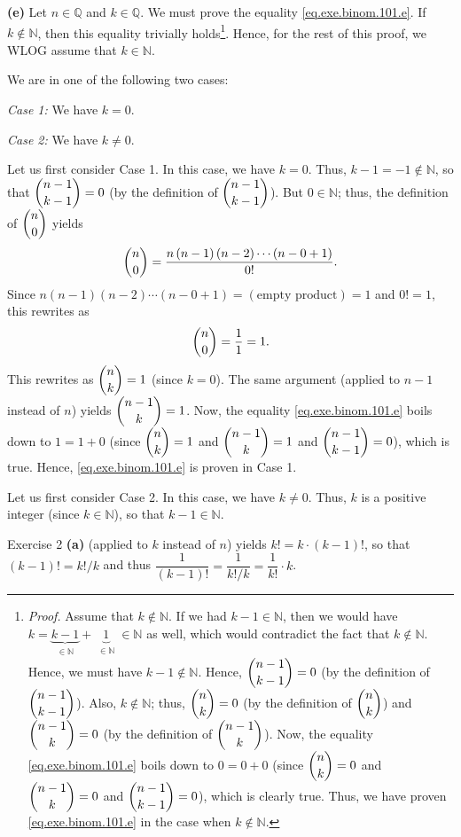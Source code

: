 \documentclass[paper=a4, fontsize=12pt]{scrartcl} %
\newcommand{\QQ}{\mathbb{Q}} %
\newcommand{\NN}{\mathbb{N}} %
\newcommand{\tup}[1]{\left( #1 \right)}
\newcommand{\underbrack}[2]{\underbrace{#1}_{\substack{#2}}}
\theoremstyle{plainsl}
\theoremstyle{definition}
\theoremstyle{remark}
\begin{document}
\textbf{(e)}
Let $n \in \QQ$ and $k \in \QQ$.
We must prove the equality \eqref{eq.exe.binom.101.e}.
If $k \notin \NN$, then this equality trivially
holds\footnote{\textit{Proof.} Assume that $k \notin \NN$.
If we had $k-1 \in \NN$, then we would have
$k = \underbrack{k-1}{\in \NN} + \underbrack{1}{\in \NN} \in \NN$
as well, which would contradict the fact that $k \notin \NN$.
Hence, we must have $k-1 \notin \NN$.
Hence, $\dbinom{n-1}{k-1} = 0$ (by the definition of
$\dbinom{n-1}{k-1}$).
Also, $k \notin \NN$; thus,
$\dbinom{n}{k} = 0$ (by the definition of $\dbinom{n}{k}$) and
$\dbinom{n-1}{k} = 0$ (by the definition of $\dbinom{n-1}{k}$).
Now, the equality \eqref{eq.exe.binom.101.e} boils down to
$0 = 0 + 0$ (since $\dbinom{n}{k} = 0$ and
$\dbinom{n-1}{k} = 0$ and $\dbinom{n-1}{k-1} = 0$), which is
clearly true.
Thus, we have proven \eqref{eq.exe.binom.101.e} in the case
when $k \notin \NN$.}.
Hence, for the rest of this proof, we WLOG assume that $k \in \NN$.

We are in one of the following two cases:

\textit{Case 1:} We have $k = 0$.

\textit{Case 2:} We have $k \neq 0$.

Let us first consider Case 1.
In this case, we have $k = 0$.
Thus, $k-1 = -1 \notin \NN$, so that $\dbinom{n-1}{k-1} = 0$
(by the definition of $\dbinom{n-1}{k-1}$).
But $0 \in \NN$; thus, the definition of $\dbinom{n}{0}$ yields
\[
\dbinom{n}{0}
= \dfrac{ n \tup{n-1} \tup{n-2} \cdots \tup{n-0+1} }{0!} .
\]
Since $n \tup{n-1} \tup{n-2} \cdots \tup{n-0+1}
= \tup{\text{empty product}} = 1$ and $0! = 1$, this rewrites as
\[
\dbinom{n}{0} = \dfrac{1}{1} = 1.
\]
This rewrites as $\dbinom{n}{k} = 1$ (since $k = 0$).
The same argument (applied to $n-1$ instead of $n$) yields
$\dbinom{n-1}{k} = 1$.
Now, the equality \eqref{eq.exe.binom.101.e} boils down to
$1 = 1 + 0$ (since $\dbinom{n}{k} = 1$ and
$\dbinom{n-1}{k} = 1$ and $\dbinom{n-1}{k-1} = 0$), which is
true.
Hence, \eqref{eq.exe.binom.101.e} is proven in Case 1.

Let us first consider Case 2.
In this case, we have $k \neq 0$.
Thus, $k$ is a positive integer (since $k \in \NN$), so that
$k-1 \in \NN$.

Exercise 2 \textbf{(a)} (applied to $k$ instead of $n$) yields
$k! = k \cdot \tup{k-1}!$, so that $\tup{k-1}! = k! / k$ and thus
$\dfrac{1}{\tup{k-1}!} = \dfrac{1}{k! / k} = \dfrac{1}{k!} \cdot k$.
\end{document}
